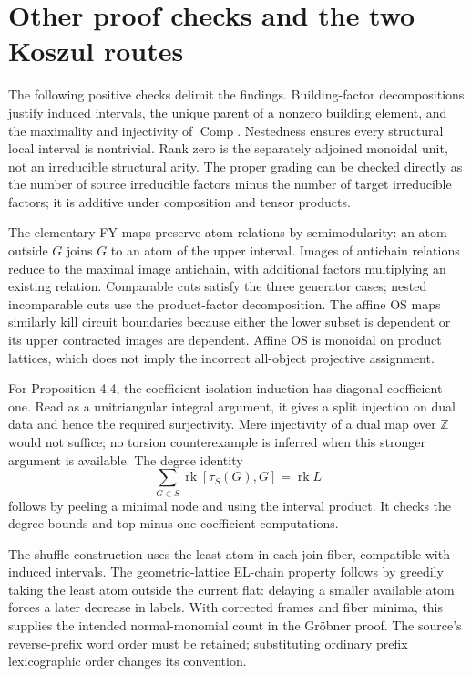 \documentclass[10pt]{article}
\begin{document}
\section*{Other proof checks and the two Koszul routes}
The following positive checks delimit the findings. Building-factor decompositions justify induced intervals, the unique parent of a nonzero building element, and the maximality and injectivity of \(\operatorname{Comp}\). Nestedness ensures every structural local interval is nontrivial. Rank zero is the separately adjoined monoidal unit, not an irreducible structural arity. The proper grading can be checked directly as the number of source irreducible factors minus the number of target irreducible factors; it is additive under composition and tensor products.\par
The elementary FY maps preserve atom relations by semimodularity: an atom outside \(G\) joins \(G\) to an atom of the upper interval. Images of antichain relations reduce to the maximal image antichain, with additional factors multiplying an existing relation. Comparable cuts satisfy the three generator cases; nested incomparable cuts use the product-factor decomposition. The affine OS maps similarly kill circuit boundaries because either the lower subset is dependent or its upper contracted images are dependent. Affine OS is monoidal on product lattices, which does not imply the incorrect all-object projective assignment.\par
For Proposition 4.4, the coefficient-isolation induction has diagonal coefficient one. Read as a unitriangular integral argument, it gives a split injection on dual data and hence the required surjectivity. Mere injectivity of a dual map over \(\mathbb Z\) would not suffice; no torsion counterexample is inferred when this stronger argument is available. The degree identity \[\sum_{G\in S}\operatorname{rk}[\tau_S(G),G]=\operatorname{rk}L\] follows by peeling a minimal node and using the interval product. It checks the degree bounds and top-minus-one coefficient computations.\par
The shuffle construction uses the least atom in each join fiber, compatible with induced intervals. The geometric-lattice EL-chain property follows by greedily taking the least atom outside the current flat: delaying a smaller available atom forces a later decrease in labels. With corrected frames and fiber minima, this supplies the intended normal-monomial count in the Gröbner proof. The source’s reverse-prefix word order must be retained; substituting ordinary prefix lexicographic order changes its convention.\par
\end{document}
